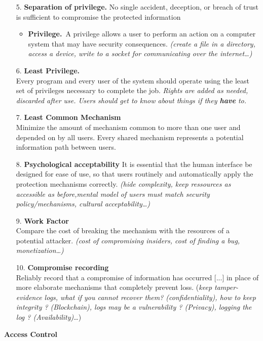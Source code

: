 \documentclass[8pt]{article}
\begin{document}
\noindent \begin{minipage}[htp]{0.49\textwidth}
	\begin{itemize}
		\item[5.] \textbf{Separation of privilege.}	No single accident, deception, or breach of trust is sufficient to compromise the protected information
		      \begin{itemize}
			      \item \textbf{Privilege.}\
			            A privilege allows a user to perform an action on a computer system that may have security consequences. \textit{(create a file in a directory, access a device, write to a socket for communicating over the internet\dots)}
		      \end{itemize}

		\item[6.] \textbf{Least Privilege.}\\
		      Every program and every user of the system should operate using the least set of privileges necessary to complete the job. \textit{Rights are added as needed, discarded after use. Users should get to know about things if they \textbf{have} to.}

		\item[7.] \textbf{Least Common Mechanism}\\
		      Minimize the amount of mechanism common to more than one user and depended on by all users. Every shared mechanism represents a potential information path between users.
		\item[8.] \textbf{Psychological acceptability}
		      It is essential that the human interface be designed for ease of use, so that users routinely and automatically apply the protection mechanisms correctly. \textit{(hide complexity, keep ressources as accessible as before,mental model of users must match security policy/mechanisms, cultural acceptability\dots)}
		\item[9.] \textbf{Work Factor}\\
		      Compare the cost of breaking the mechanism with the resources of a potential attacker. \textit{(cost of compromising insiders, cost of finding a bug, monetization\dots)}
		\item[10.] \textbf{Compromise recording}\\
		      Reliably record that a compromise of information has occurred [...] in place of more elaborate mechanisms that completely prevent loss.
		      (\textit{keep tamper-evidence logs, what if you cannot recover them? (confidentiality), how to keep integrity ? (Blockchain), logs may be a vulnerability ? (Privacy), logging the log ? (Availability)}\ldots)
	\end{itemize}
\end{minipage}

\newpage
\textbf{Access Control}
\end{document}
